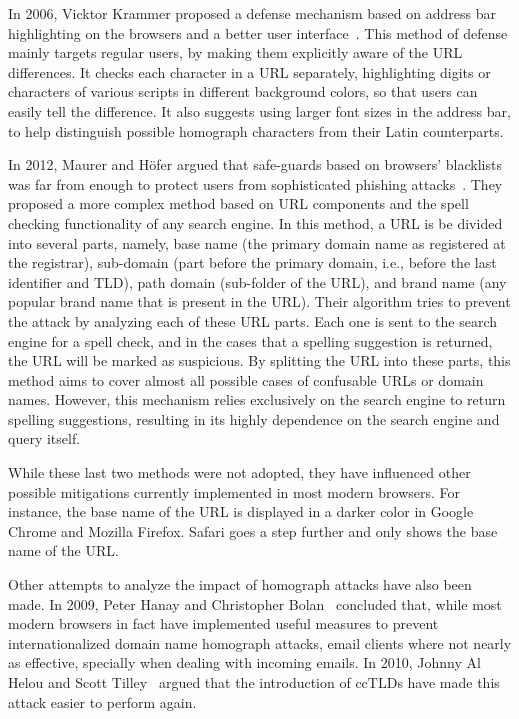 \documentclass[letterpaper,twocolumn,10pt]{article}
\begin{document}
In 2006, Vicktor Krammer proposed a defense mechanism based on address bar highlighting on the browsers and a better user interface~\cite{krammer2006}.
This method of defense mainly targets regular users, by making them explicitly aware of the URL differences.
It checks each character in a URL separately, highlighting digits or characters of various scripts in different background colors, so that users can easily tell the difference.
It also suggests using larger font sizes in the address bar, to help distinguish possible homograph characters from their Latin counterparts.

In 2012, Maurer and H\"{o}fer argued that safe-guards based on browsers' blacklists was far from enough to protect users from sophisticated phishing attacks~\cite{maurer2012}.
They proposed a more complex method based on URL components and the spell checking functionality of any search engine.
In this method, a URL is be divided into several parts, namely, base name (the primary domain name as registered at the registrar), sub-domain (part before the primary domain, i.e., before the last identifier and TLD), path domain (sub-folder of the URL), and brand name (any popular brand name that is present in the URL).
Their algorithm tries to prevent the attack by analyzing each of these URL parts.
Each one is sent to the search engine for a spell check, and in the cases that a spelling suggestion is returned, the URL will be marked as suspicious.
By splitting the URL into these parts, this method aims to cover almost all possible cases of confusable URLs or domain names.
However, this mechanism relies exclusively on the search engine to return spelling suggestions, resulting in its highly dependence on the search engine and query itself.

While these last two methods were not adopted, they have influenced other possible mitigations currently implemented in most modern browsers.
For instance, the base name of the URL is displayed in a darker color in Google Chrome and Mozilla Firefox.
Safari goes a step further and only shows the base name of the URL.

Other attempts to analyze the impact of homograph attacks have also been made.
In 2009, Peter Hanay and Christopher Bolan~\cite{hannay2009} concluded that, while most modern browsers in fact have implemented useful measures to prevent internationalized domain name homograph attacks, email clients where not nearly as effective, specially when dealing with incoming emails.
In 2010, Johnny Al Helou and Scott Tilley~\cite{al2010} argued that the introduction of ccTLDs have made this attack easier to perform again.
\end{document}
